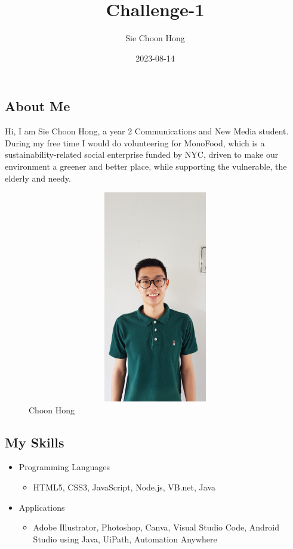 \documentclass[
]{article}
\title{Challenge-1}
\author{Sie Choon Hong}
\date{2023-08-14}
\providecommand{\tightlist}{%
  \setlength{\itemsep}{0pt}\setlength{\parskip}{0pt}}
\begin{document}
\maketitle

\hypertarget{about-me}{%
\subsection{\texorpdfstring{\textbf{About
Me}}{About Me}}\label{about-me}}

Hi, I am Sie Choon Hong, a year 2 Communications and New Media student.
During my free time I would do volunteering for MonoFood, which is a
sustainability-related social enterprise funded by NYC, driven to make
our environment a greener and better place, while supporting the
vulnerable, the elderly and needy.

\begin{figure}

{\centering \includegraphics[width=500px,height=350px]{Choon Hong} 

}

\caption{Choon Hong}\label{fig:unnamed-chunk-1}
\end{figure}

\hypertarget{my-skills}{%
\subsection{My Skills}\label{my-skills}}

\begin{itemize}
\tightlist
\item
  Programming Languages

  \begin{itemize}
  \tightlist
  \item
    HTML5, CSS3, JavaScript, Node.js, VB.net, Java
  \end{itemize}
\item
  Applications

  \begin{itemize}
  \tightlist
  \item
    Adobe Illustrator, Photoshop, Canva, Visual Studio Code, Android
    Studio using Java, UiPath, Automation Anywhere
  \end{itemize}
\end{itemize}
\end{document}

